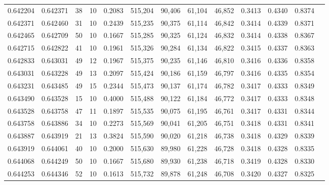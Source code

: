 \begin{tabular}{rrrrrrrrrrrrr}
0.642204 & 0.642371 &    38 &  10 &                                     0.2083 & 515,204 &  90,406 &  61,104 &  46,852 & 0.3413 & 0.4340 & 0.8374 \\
0.642371 & 0.642460 &    31 &  10 &                                     0.2439 & 515,235 &  90,375 &  61,114 &  46,842 & 0.3414 & 0.4339 & 0.8371 \\
0.642465 & 0.642709 &    50 &  10 &                                     0.1667 & 515,285 &  90,325 &  61,124 &  46,832 & 0.3414 & 0.4338 & 0.8367 \\
0.642715 & 0.642822 &    41 &  10 &                                     0.1961 & 515,326 &  90,284 &  61,134 &  46,822 & 0.3415 & 0.4337 & 0.8363 \\
0.642833 & 0.643031 &    49 &  12 &                                     0.1967 & 515,375 &  90,235 &  61,146 &  46,810 & 0.3416 & 0.4336 & 0.8358 \\
0.643031 & 0.643228 &    49 &  13 &                                     0.2097 & 515,424 &  90,186 &  61,159 &  46,797 & 0.3416 & 0.4335 & 0.8354 \\
0.643231 & 0.643485 &    49 &  15 &                                     0.2344 & 515,473 &  90,137 &  61,174 &  46,782 & 0.3417 & 0.4333 & 0.8349 \\
0.643490 & 0.643528 &    15 &  10 &                                     0.4000 & 515,488 &  90,122 &  61,184 &  46,772 & 0.3417 & 0.4333 & 0.8348 \\
0.643528 & 0.643758 &    47 &  11 &                                     0.1897 & 515,535 &  90,075 &  61,195 &  46,761 & 0.3417 & 0.4331 & 0.8344 \\
0.643758 & 0.643886 &    34 &  10 &                                     0.2273 & 515,569 &  90,041 &  61,205 &  46,751 & 0.3418 & 0.4331 & 0.8341 \\
0.643887 & 0.643919 &    21 &  13 &                                     0.3824 & 515,590 &  90,020 &  61,218 &  46,738 & 0.3418 & 0.4329 & 0.8339 \\
0.643919 & 0.644061 &    40 &  10 &                                     0.2000 & 515,630 &  89,980 &  61,228 &  46,728 & 0.3418 & 0.4328 & 0.8335 \\
0.644068 & 0.644249 &    50 &  10 &                                     0.1667 & 515,680 &  89,930 &  61,238 &  46,718 & 0.3419 & 0.4328 & 0.8330 \\
0.644253 & 0.644346 &    52 &  10 &                                     0.1613 & 515,732 &  89,878 &  61,248 &  46,708 & 0.3420 & 0.4327 & 0.8325 \\

\end{tabular}
